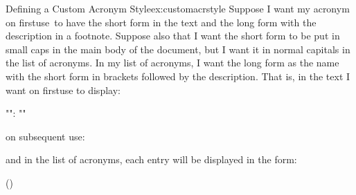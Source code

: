 \documentclass[report,inlinetitle]{nlctdoc}
\newcommand*{\firstuse}{\gls{firstuse}}
\begin{document}
\begin{example}{Defining a Custom Acronym Style}{ex:customacrstyle}
Suppose I want my acronym on \firstuse\ to have the
short form in the text and the long form with the description in a
footnote. Suppose also that I want the short form to be put in small
caps in the main body of the document, but I want it in normal
capitals in the list of acronyms. In my list of acronyms, I want the
long form as the name with the short form in brackets followed by
the description. That is, in the text I want  on \gls{firstuse}
to display:
\begin{display}
"{": "}"
\end{display}
on subsequent use:
\begin{display}
\end{display}
and in the list of acronyms, each entry will be displayed in the
form:
\begin{display}
 () 
\end{display}


\end{example}
\end{document}
